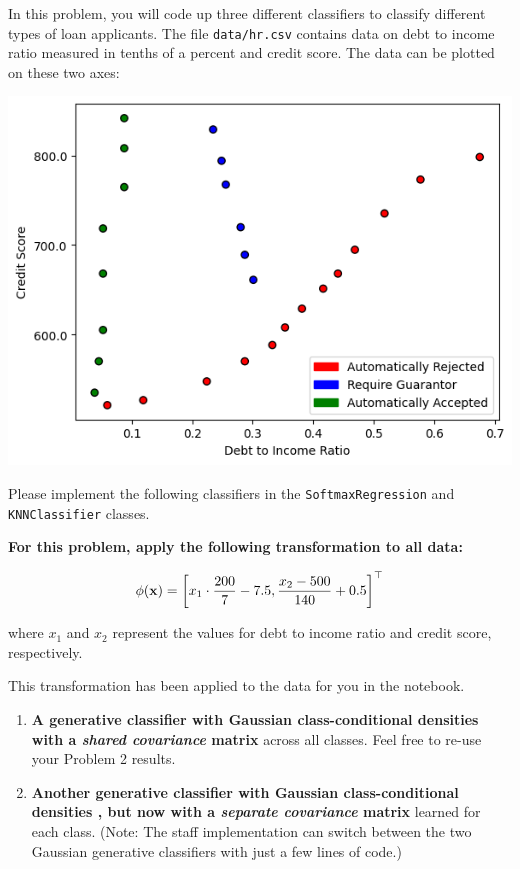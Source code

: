 \documentclass[submit]{../harvardml}
\begin{document}
\begin{problem}
In this problem, you will code up three different classifiers to classify different types of loan applicants. The file \verb|data/hr.csv| contains data on debt to income ratio measured in tenths of a percent and credit score. The data can be plotted on these two axes:
\begin{center}
  \includegraphics[width=.5\textwidth]{img_input/credit.png}
\end{center}

Please implement the following classifiers in the \verb|SoftmaxRegression| and \verb|KNNClassifier| classes.

\textbf{For this problem, apply the following transformation to all data:}

$$\phi(\mathbf{x}) = \left[x_1 \cdot \frac{200}{7}-7.5, \frac{x_2-500}{140}+0.5\right]^\top$$

  where $x_1$ and $x_2$ represent the values for debt to income ratio and credit score, respectively.
  
  This transformation has been applied to the data for you in the notebook.

\begin{enumerate}[label=\alph*)]

  \item \textbf{A generative classifier with Gaussian class-conditional
          densities with a \textit{shared covariance} matrix} across all classes.
        Feel free to re-use your Problem 2 results.

  \item \textbf{Another generative classifier with Gaussian class-conditional densities , but now
          with a \textit{separate covariance} matrix} learned for each class. (Note:
        The staff implementation can switch between the two Gaussian generative classifiers with just a
        few lines of code.)


\end{enumerate}
\end{problem}
\end{document}
